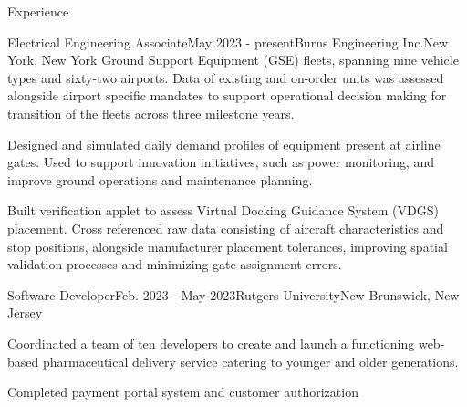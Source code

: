 \documentclass{resume}
\begin{document}
\begin{rSection}{Experience}
\begin{rSubsection}{Electrical Engineering Associate}{May 2023 - present}{Burns Engineering Inc.}{New York, New York}
                Ground Support Equipment (GSE) fleets, spanning nine vehicle
                types and sixty-two airports. Data of existing and on-order
                units was assessed alongside airport specific mandates to
                support operational decision making for transition of the
                fleets across three milestone years.
            \item Designed and simulated daily demand profiles of equipment
                present at airline gates. Used to support innovation
                initiatives, such as power monitoring, and improve ground
                operations and maintenance planning.
            \item Built verification applet to assess Virtual Docking Guidance
                System (VDGS) placement. Cross referenced raw data consisting
                of aircraft characteristics and stop positions, alongside
                manufacturer placement tolerances, improving spatial validation
                processes and minimizing gate assignment errors.
        \end{rSubsection}
        \begin{rSubsection}{Software Developer}{Feb. 2023 - May 2023}{Rutgers University}{New Brunswick, New Jersey}
            \item Coordinated a team of ten developers to create and launch a
                functioning web-based pharmaceutical delivery service catering
                to younger and older generations.
            \item Completed payment portal system and customer authorization

\end{rSubsection}
\end{rSection}
\end{document}
